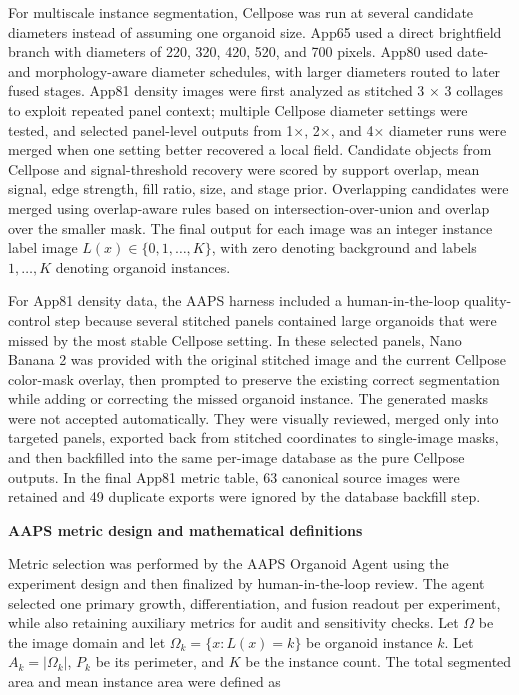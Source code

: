 \documentclass[
]{article}
\begin{document}
For multiscale instance segmentation, Cellpose was run at several candidate diameters instead of assuming one organoid size. App65 used a direct brightfield branch with diameters of 220, 320, 420, 520, and 700 pixels. App80 used date- and morphology-aware diameter schedules, with larger diameters routed to later fused stages. App81 density images were first analyzed as stitched 3 × 3 collages to exploit repeated panel context; multiple Cellpose diameter settings were tested, and selected panel-level outputs from 1×, 2×, and 4× diameter runs were merged when one setting better recovered a local field. Candidate objects from Cellpose and signal-threshold recovery were scored by support overlap, mean signal, edge strength, fill ratio, size, and stage prior. Overlapping candidates were merged using overlap-aware rules based on intersection-over-union and overlap over the smaller mask. The final output for each image was an integer instance label image \(L\left( x \right) \in \{ 0,1,\ldots,K\}\), with zero denoting background and labels \(1,\ldots,K\) denoting organoid instances.

For App81 density data, the AAPS harness included a human-in-the-loop quality-control step because several stitched panels contained large organoids that were missed by the most stable Cellpose setting. In these selected panels, Nano Banana 2 was provided with the original stitched image and the current Cellpose color-mask overlay, then prompted to preserve the existing correct segmentation while adding or correcting the missed organoid instance. The generated masks were not accepted automatically. They were visually reviewed, merged only into targeted panels, exported back from stitched coordinates to single-image masks, and then backfilled into the same per-image database as the pure Cellpose outputs. In the final App81 metric table, 63 canonical source images were retained and 49 duplicate exports were ignored by the database backfill step.

\textbf{AAPS metric design and mathematical definitions}

Metric selection was performed by the AAPS Organoid Agent using the experiment design and then finalized by human-in-the-loop review. The agent selected one primary growth, differentiation, and fusion readout per experiment, while also retaining auxiliary metrics for audit and sensitivity checks. Let \(\Omega\) be the image domain and let \(\Omega_{k} = \{ x:L\left( x \right) = k\}\) be organoid instance \(k\). Let \(A_{k} = \left| \Omega_{k} \right|\), \(P_{k}\) be its perimeter, and \(K\) be the instance count. The total segmented area and mean instance area were defined as
\end{document}
